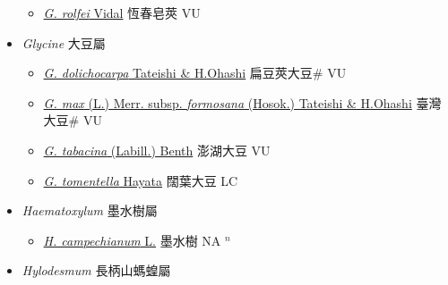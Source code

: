 \begin{itemize}
  \begin{itemize}
        \item[] \href{http://www.theplantlist.org/tpl1.1/search?q=Gleditsia+rolfei}{\textit{G. rolfei} Vidal}   恆春皂莢 VU
  \end{itemize}
 \item[] \textit{Glycine} 大豆屬
                    
  \begin{itemize}
        \item[] \href{http://www.theplantlist.org/tpl1.1/search?q=Glycine+dolichocarpa}{\textit{G. dolichocarpa} Tateishi \& H.Ohashi}   扁豆莢大豆\# VU
        \item[] \href{http://www.theplantlist.org/tpl1.1/search?q=Glycine+max+subsp.+formosana}{\textit{G. max} (L.) Merr. subsp. \textit{formosana} (Hosok.) Tateishi \& H.Ohashi}   臺灣大豆\# VU
        \item[] \href{http://www.theplantlist.org/tpl1.1/search?q=Glycine+tabacina}{\textit{G. tabacina} (Labill.) Benth}   澎湖大豆 VU
        \item[] \href{http://www.theplantlist.org/tpl1.1/search?q=Glycine+tomentella}{\textit{G. tomentella} Hayata}   闊葉大豆 LC
  \end{itemize}
 \item[] \textit{Haematoxylum} 墨水樹屬
                    
  \begin{itemize}
        \item[] \href{http://www.theplantlist.org/tpl1.1/search?q=Haematoxylum+campechianum}{\textit{H. campechianum} L.}   墨水樹 NA $^n$
  \end{itemize}
 \item[] \textit{Hylodesmum} 長柄山螞蝗屬
                    

\end{itemize}
